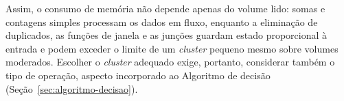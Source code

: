 Assim, o consumo de memória não depende apenas do volume lido: somas e contagens simples processam os dados em fluxo, enquanto a eliminação de duplicados, as funções de janela e as junções guardam estado proporcional à entrada e podem exceder o limite de um \textit{cluster} pequeno mesmo sobre volumes moderados. Escolher o \textit{cluster} adequado exige, portanto, considerar também o tipo de operação, aspecto incorporado ao Algoritmo de decisão (Seção~\ref{sec:algoritmo-decisao}).
